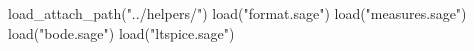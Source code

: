 \begin{sagesilent}
    load_attach_path("../helpers/")
    load("format.sage")
    load("measures.sage")
    load("bode.sage")
    load("ltspice.sage")
\end{sagesilent}